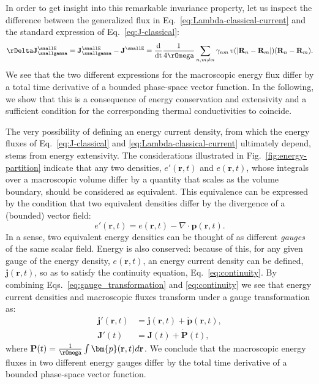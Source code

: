 In order to get insight into this remarkable invariance property, let us inspect the difference between the generalized flux in Eq.~\eqref{eq:Lambda-classical-current} and the standard expression of Eq.~\eqref{eq:J-classical}:
\begin{equation}
  \rDelta\mathbf{J}^\smallE_{\smallgamma} =\mathbf{J}^\smallE_{\smallgamma}-\mathbf{J}^\smallE  =\frac{\mathrm{d}}{\mathrm{dt}}\frac{1}{4 \rOmega} \sum_{n,m\ne n}  \gamma_{nm} \, v(|\mathbf{R}_{n}-\mathbf{R}_{m}|)  (\mathbf{R}_{n}-\mathbf{R}_{m}). \label{eq:DeltaJ}
\end{equation}
We see that the two different expressions for the macroscopic energy flux differ by a total time derivative of a bounded phase-space vector function. In the following, we show that this is a consequence of energy conservation and extensivity and a sufficient condition for the corresponding thermal conductivities to coincide.

The very possibility of defining an energy current density, from which the energy fluxes of Eq.~\eqref{eq:J-classical} and \eqref{eq:Lambda-classical-current} ultimately depend, stems from energy extensivity. The considerations illustrated in Fig.~\ref{fig:energy-partition} indicate that any two densities, $e'(\mathbf{r},t)$ and $e(\mathbf{r},t)$, whose integrals over a macroscopic volume differ by a quantity that scales as the volume boundary, should be considered as equivalent. This equivalence can be expressed by the condition that two equivalent densities differ by the divergence of a (bounded) vector field:
\begin{equation}
  e'(\mathbf{r},t)=e(\mathbf{r},t) - \nabla\cdot \bm{p}(\mathbf{r},t). \label{eq:gauge_transformation}
\end{equation}
In a sense, two equivalent energy densities can be thought of as different \emph{gauges} of the same scalar field. Energy is also conserved: because of this, for any given gauge of the energy density, $e(\mathbf{r},t)$, an energy current density can be defined, $\bm{j}(\mathbf{r},t)$, so as to satisfy the continuity equation, Eq.~\eqref{eq:continuity}. By combining Eqs.~\eqref{eq:gauge_transformation} and \eqref{eq:continuity} we see that energy current densities and macroscopic fluxes transform under a gauge transformation as:
\begin{align}
 \bm{j}'(\mathbf{r},t) & = \bm{j}(\mathbf{r},t) + \dot{\bm{p}}(\mathbf{r},t), \label{eq:current_density_gauge} \\
  \mathbf{J}'(t) & = \mathbf{J}(t) + \dot{\mathbf{P}}(t), \label{eq:macroscopic_flux_gauge}
\end{align}
where $\mathbf{P}(t)=\frac{1}{\rOmega} \int\bm{p}(\mathbf{r},t)d\mathbf{r}$. We
conclude that the macroscopic energy fluxes in two different energy gauges differ by the total time derivative of a bounded phase-space vector function.

